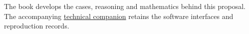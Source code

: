 \documentclass[12pt,a4paper,oneside,openany]{book}
\begin{document}
The book develops the cases, reasoning and mathematics behind this proposal.
The accompanying \href{technical-companion.pdf}{technical companion} retains the
software interfaces and reproduction records.

\tableofcontents
\mainmatter










\backmatter
\begingroup
\raggedright


\endgroup
\end{document}

